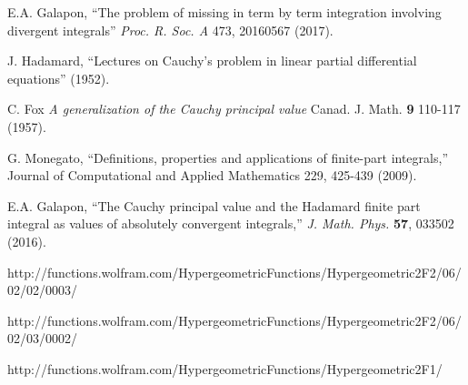 \begin{thebibliography}{00}
 E.A. Galapon, ``The problem of missing in term by term integration involving divergent integrals'' {\it Proc. R. Soc. A} 473, 20160567 (2017).


 J. Hadamard, ``Lectures on Cauchy's problem in linear partial differential equations'' (1952).

 C. Fox {\it A generalization of the Cauchy principal value} Canad. J. Math. {\bf 9} 110-117 (1957).

 G. Monegato, ``Definitions, properties and applications of finite-part integrals,'' Journal of Computational and Applied Mathematics 229, 425-439 (2009).

 E.A. Galapon, ``The Cauchy principal value and the Hadamard finite part integral as values of absolutely convergent integrals,''  {\it J. Math. Phys.} {\bf 57}, 033502 (2016).








http://functions.wolfram.com/HypergeometricFunctions/Hypergeometric2F2/06/02/02/0003/

http://functions.wolfram.com/HypergeometricFunctions/Hypergeometric2F2/06/02/03/0002/

http://functions.wolfram.com/HypergeometricFunctions/Hypergeometric2F1/

\end{thebibliography}


